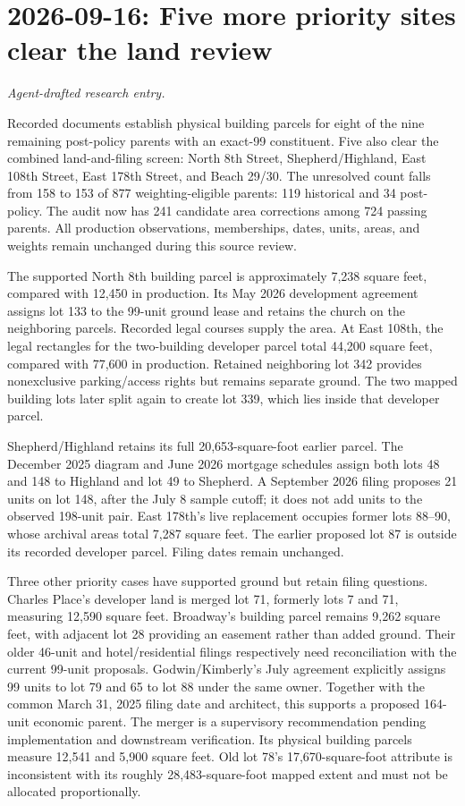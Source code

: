 \clearpage
\section*{2026-09-16: Five more priority sites clear the land review}
\textit{Agent-drafted research entry.}

Recorded documents establish physical building parcels for eight of the nine
remaining post-policy parents with an exact-99 constituent. Five also clear the
combined land-and-filing screen: North 8th Street, Shepherd/Highland, East 108th
Street, East 178th Street, and Beach 29/30. The unresolved count falls from 158 to 153 of
877 weighting-eligible parents: 119 historical and 34 post-policy. The audit
now has 241 candidate area corrections among 724 passing parents. All
production observations, memberships, dates, units, areas, and weights remain
unchanged during this source review.

The supported North 8th building parcel is approximately 7,238 square feet,
compared with 12,450 in production. Its May 2026 development agreement assigns
lot 133 to the 99-unit ground lease and retains the church on the neighboring
parcels. Recorded legal courses supply the area. At East 108th, the legal rectangles for the two-building developer
parcel total 44,200 square feet, compared with 77,600 in production. Retained
neighboring lot 342 provides nonexclusive parking/access rights but remains
separate ground. The two mapped building lots later split again to create
lot 339, which lies inside that developer parcel.

Shepherd/Highland retains its full 20,653-square-foot earlier parcel. The
December 2025 diagram and June 2026 mortgage schedules assign both lots 48
and 148 to Highland and lot 49 to Shepherd. A September 2026 filing proposes
21 units on lot 148, after the July 8 sample cutoff; it does not add units to
the observed 198-unit pair. East 178th's live replacement occupies former
lots 88--90, whose archival areas total 7,287 square feet. The earlier proposed
lot 87 is outside its recorded developer parcel. Filing dates remain unchanged.

Three other priority cases have supported ground but retain filing questions.
Charles Place's developer land is merged lot 71, formerly lots 7 and 71,
measuring 12,590 square feet. Broadway's building parcel remains 9,262 square
feet, with adjacent lot 28 providing an easement rather than added ground.
Their older 46-unit and hotel/residential filings respectively need reconciliation
with the current 99-unit proposals. Godwin/Kimberly's July agreement explicitly
assigns 99 units to lot 79 and 65 to lot 88 under the same owner. Together with
the common March 31, 2025 filing date and architect, this supports a proposed
164-unit economic parent. The merger is a supervisory recommendation pending
implementation and downstream verification. Its physical building parcels
measure 12,541 and 5,900 square feet. Old lot 78's 17,670-square-foot attribute
is inconsistent with its roughly 28,483-square-foot mapped extent and must
not be allocated proportionally.

